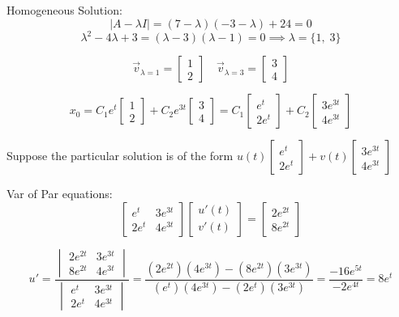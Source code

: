 \documentclass[12pt]{article}
\begin{document}
Homogeneous Solution:
\[|A - \lambda I | = (7 - \lambda)(-3 - \lambda) + 24 = 0 \]
\[\lambda^2 - 4\lambda + 3 = (\lambda - 3)(\lambda - 1) = 0 \implies \lambda = \{1, \; 3\}\]

\[\vec{v}_{\lambda = 1} = \begin{bmatrix}
    1\\2
\end{bmatrix} \quad \vec{v}_{\lambda = 3} = \begin{bmatrix}
    3\\4
\end{bmatrix}\]

\[x_0 = C_1 e^t \begin{bmatrix}
    1\\2
\end{bmatrix} + C_2 e^{3t} \begin{bmatrix}
    3\\4
\end{bmatrix} = C_1 \begin{bmatrix}
    e^t\\
    2e^t
\end{bmatrix} + C_2 \begin{bmatrix}
    3e^{3t}\\
    4e^{3t}
\end{bmatrix}\]

Suppose the particular solution is of the form $u(t) \begin{bmatrix}
    e^t\\
    2e^t
\end{bmatrix} + v(t) \begin{bmatrix}
    3e^{3t}\\
    4e^{3t}
\end{bmatrix}$

Var of Par equations:
\[\begin{bmatrix}
    e^t & 3e^{3t}\\
    2e^t & 4e^{3t}
\end{bmatrix} \begin{bmatrix}
    u'(t)\\
    v'(t)
\end{bmatrix} = \begin{bmatrix}
    2e^{2t}\\
    8e^{2t}
\end{bmatrix}\]

\[u' = \frac{\begin{vmatrix}
    2e^{2t} & 3e^{3t}\\
    8e^{2t} & 4e^{3t}
\end{vmatrix}}{\begin{vmatrix}
    e^t & 3e^{3t}\\
    2e^t & 4e^{3t}
\end{vmatrix}} = \frac{(2e^{2t})(4e^{3t}) - (8e^{2t})(3e^{3t})}{(e^t)(4e^{3t}) - (2e^t)(3e^{3t})} = \frac{-16e^{5t}}{-2e^{4t}} = 8e^t\]
\end{document}
